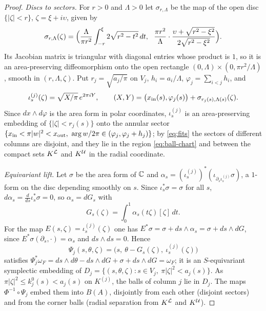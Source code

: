 \documentclass[11pt]{amsart}
\begin{document}
\begin{proof}
\emph{Discs to sectors.} For $r>0$ and $\Lambda>0$ let $\sigma_{r,\Lambda}$ be the map of the open disc
$\{|\zeta|<r\}$, $\zeta=\xi+i\upsilon$, given by
\[
\sigma_{r,\Lambda}(\zeta)=\Bigl(\frac{\Lambda}{\pi r^2}\int_{-r}^{\xi}2\sqrt{r^2-t^2}\,dt,\ \
\frac{\pi r^2}{\Lambda}\cdot\frac{\upsilon+\sqrt{r^2-\xi^2}}{2\sqrt{r^2-\xi^2}}\Bigr).
\]
Its Jacobian matrix is triangular with diagonal entries whose product is $1$, so it is an area-preserving
diffeomorphism onto the open rectangle $(0,\Lambda)\times(0,\pi r^2/\Lambda)$, smooth in $(r,\Lambda,\zeta)$. Put
$r_j=\sqrt{a_j/\pi}$ on $V_j$, $h_i=a_i/\Lambda$, $\varphi_j=\sum_{i<j}h_i$, and
\[
\iota_s^{(j)}(\zeta)=\sqrt{X/\pi}\,e^{2\pi iY},\qquad
(X,Y)=\bigl(x_{\rm in}(s),\varphi_j(s)\bigr)+\sigma_{r_j(s),\Lambda(s)}(\zeta).
\]
Since $dx\wedge d\varphi$ is the area form in polar coordinates, $\iota^{(j)}_s$ is an area-preserving embedding of
$\{|\zeta|<r_j(s)\}$ onto the annular sector $\{x_{\rm in}<\pi|w|^2<x_{\rm out},\ \arg w/2\pi\in(\varphi_j,\varphi_j+h_j)\}$;
by \eqref{eq:fits} the sectors of different columns are disjoint, and they lie in the region \eqref{eq:ball-chart}
and between the compact sets $K^{\mathcal{L}}$ and $K^{\mathcal{U}}$ in the radial coordinate.

\emph{Equivariant lift.} Let $\sigma$ be the area form of $\mathbb{C}$ and
$\alpha_s=(\iota^{(j)}_s)^*(\iota_{\partial_s\iota^{(j)}_s}\sigma)$, a $1$-form on the disc depending smoothly on
$s$. Since $\iota_s^*\sigma=\sigma$ for all $s$, $d\alpha_s=\frac{d}{ds}\iota_s^*\sigma=0$, so $\alpha_s=dG_s$ with
\begin{equation}\label{eq:G}
G_s(\zeta)=\int_0^1\alpha_s(t\zeta)[\zeta]\,dt .
\end{equation}
For the map $E(s,\zeta)=\iota^{(j)}_s(\zeta)$ one has $E^*\sigma=\sigma+ds\wedge\alpha_s=\sigma+ds\wedge dG$, since
$E^*\sigma(\partial_s,\cdot)=\alpha_s$ and $ds\wedge ds=0$. Hence
\[
\Psi_j(s,\theta,\zeta)=\bigl(s,\ \theta-G_s(\zeta),\ \iota^{(j)}_s(\zeta)\bigr)
\]
satisfies $\Psi_j^*\omega_F=ds\wedge d\theta-ds\wedge dG+\sigma+ds\wedge dG=\omega_F$; it is an
$S$-equivariant symplectic embedding of $D_j=\{(s,\theta,\zeta):s\in V_j,\ \pi|\zeta|^2<a_j(s)\}$. As
$\pi|\zeta|^2\le k_j^0(s)<a_j(s)$ on $K^{(j)}$, the balls of column $j$ lie in $D_j$. The maps
$\Phi^{-1}\circ\Psi_j$ embed them into $B(A)$, disjointly from each other (disjoint sectors) and from the corner
balls (radial separation from $K^{\mathcal{L}}$ and $K^{\mathcal{U}}$).
\end{proof}

\end{document}
